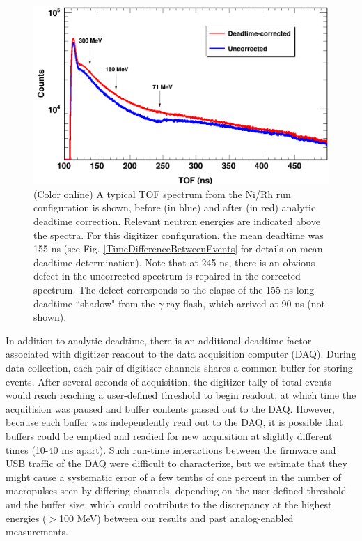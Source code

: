 \documentclass[twocolumn,secnumarabic,amssymb, nobibnotes, aps, prl,
superscriptaddress, nobalancelastpage]{revtex4}
\begin{document}
\begin{figure}
    \includegraphics[scale=0.3]{figures/CorrectionEffectOnTOF.png}
    \caption{(Color online) A typical TOF spectrum from the Ni/Rh
        run configuration is shown, before (in blue) and after (in red) analytic
        deadtime correction. Relevant neutron energies are indicated above the spectra.
        For this digitizer configuration, the mean deadtime was 155 ns (see Fig.
        \ref{TimeDifferenceBetweenEvents} for details on mean deadtime determination).
        Note that at 245 ns, there is an
        obvious defect in the uncorrected spectrum is repaired in the corrected
        spectrum. The defect
        corresponds to the elapse of the 155-ns-long deadtime ``shadow" from the $\gamma$-ray
        flash, which arrived at 90 ns (not shown).
    }
    \label{CorrectionEffectOnTOF}
\end{figure}

In addition to analytic deadtime, there is an additional deadtime factor associated with 
digitizer readout to the data acquisition computer (DAQ). During data
collection, each pair of digitizer channels shares a common buffer for storing events.
After several seconds of acquisition, the digitizer tally of total events would
reach reaching a user-defined threshold to begin readout, at which time the
acquitision was paused and buffer contents passed out to the DAQ. However,
because each buffer was independently read out to the DAQ, it is possible that buffers
could be emptied and readied for new acquisition at slightly different times
(10-40 ms apart). Such run-time interactions between the firmware and USB
traffic of the DAQ were difficult to characterize, but we estimate that they might cause a 
systematic error of a few tenths of one
percent in the number of macropulses seen by differing channels, depending on the user-defined 
threshold and the buffer size, which could contribute to the discrepancy at the
highest energies ($>$100 MeV) between our results and past analog-enabled
measurements. 
\end{document}

